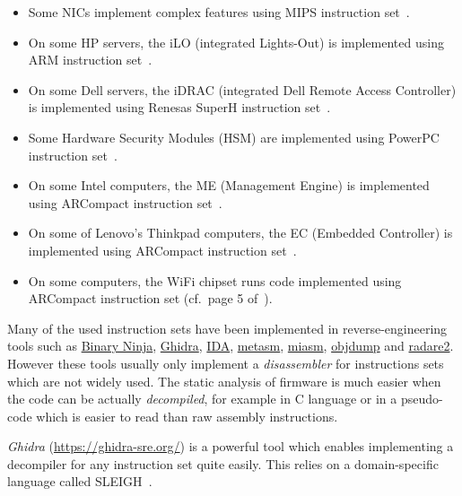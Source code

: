 \begin{itemize}

\item
  Some NICs implement complex features using MIPS instruction
  set~\cite{analyzingarcompactfirmwarewithghidra:sstic2010netcard}.
\item
  On some HP servers, the iLO (integrated Lights-Out) is implemented
  using ARM instruction
  set~\cite{analyzingarcompactfirmwarewithghidra:sstic2018ilo}.
\item
  On some Dell servers, the iDRAC (integrated Dell Remote Access
  Controller) is implemented using Renesas SuperH instruction
  set~\cite{analyzingarcompactfirmwarewithghidra:sstic2019idrackar}.
\item
  Some Hardware Security Modules (HSM) are implemented using PowerPC
  instruction
  set~\cite{analyzingarcompactfirmwarewithghidra:sstic2019hsm}.
\item
  On some Intel computers, the ME (Management Engine) is implemented
  using ARCompact instruction
  set~\cite{analyzingarcompactfirmwarewithghidra:recon2014intelme}.
\item
  On some of Lenovo's Thinkpad computers, the EC (Embedded Controller)
  is implemented using ARCompact instruction
  set~\cite{analyzingarcompactfirmwarewithghidra:thinkpadec,analyzingarcompactfirmwarewithghidra:sstic2011kbc}.
\item
  On some computers, the WiFi chipset runs code implemented using
  ARCompact instruction set (cf.~page 5
  of~\cite{analyzingarcompactfirmwarewithghidra:sstic2011kbc}).
\end{itemize}

Many of the used instruction sets have been implemented in
reverse-engineering tools such as \href{https://binary.ninja/}{Binary
Ninja}, \href{https://ghidra-sre.org/}{Ghidra},
\href{https://www.hex-rays.com/products/ida/}{IDA},
\href{https://github.com/jjyg/metasm}{metasm},
\href{https://github.com/cea-sec/miasm}{miasm},
\href{https://man7.org/linux/man-pages/man1/objdump.1.html}{objdump} and
\href{https://github.com/radareorg/radare2}{radare2}. However these
tools usually only implement a \emph{disassembler} for instructions sets
which are not widely used. The static analysis of firmware is much
easier when the code can be actually \emph{decompiled}, for example in C
language or in a pseudo-code which is easier to read than raw assembly
instructions.

\emph{Ghidra} (\url{https://ghidra-sre.org/}) is a powerful tool which
enables implementing a decompiler for any instruction set quite easily.
This relies on a domain-specific language called
SLEIGH~\cite{analyzingarcompactfirmwarewithghidra:ghidradoclanguage}.


